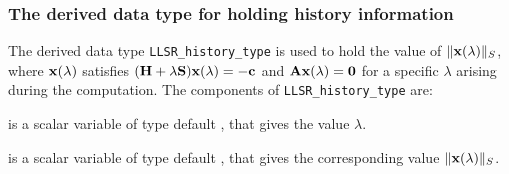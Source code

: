 \documentclass{galahad}
\newcommand{\packagename}{LLSR}
\begin{document}

\subsubsection{The derived data type for holding history
 information}\label{typehist}
The derived data type
{\tt \packagename\_history\_type}
is used to hold the value of $\|{\mathbf{x}}(\lambda)\|_S$, where
${\mathbf{x}}(\lambda)$ satisfies
$({\mathbf{H}} + \lambda {\mathbf{S}}){\mathbf{x}}(\lambda) = - {\mathbf{c}}$ and ${\mathbf{A}}{\mathbf{x}}(\lambda) = {\mathbf{0}}$
for a specific $\lambda$ arising during the computation.
The components of
{\tt \packagename\_history\_type}
are:
\begin{description}
 is a scalar variable of type default \realdp, that gives
 the value $\lambda$.

 is a scalar variable of type default \real, that gives
 the corresponding value $\|{\mathbf{x}}(\lambda)\|_S$.

\end{description}

\end{document}
